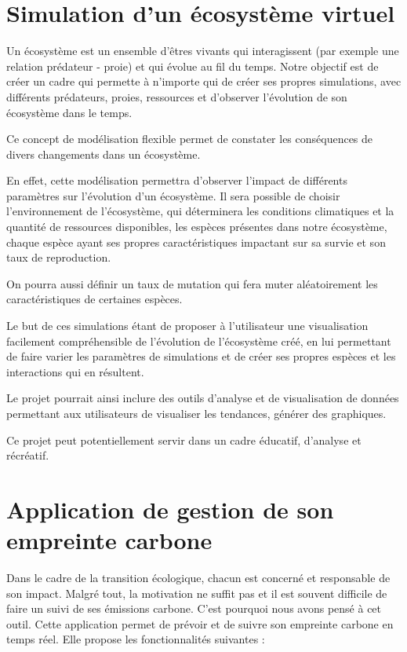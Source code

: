 \documentclass{article}
\begin{document}
\newpage

\section{Simulation d'un écosystème virtuel}

Un écosystème est un ensemble d'êtres vivants qui interagissent (par exemple une relation prédateur - proie) et qui évolue au fil du temps. Notre objectif est de créer un cadre qui permette à n'importe qui de créer ses propres simulations, avec différents prédateurs, proies, ressources et d'observer l'évolution de son écosystème dans le temps. \bigskip

Ce concept de modélisation flexible permet de constater les conséquences de divers changements dans un écosystème. \bigskip

En effet, cette modélisation permettra d'observer l'impact de différents paramètres sur l'évolution d'un écosystème. Il sera possible de choisir l'environnement de l'écosystème, qui déterminera les conditions climatiques et la quantité de ressources disponibles, les espèces présentes dans notre écosystème, chaque espèce ayant ses propres caractéristiques impactant sur sa survie et son taux de reproduction. \bigskip

On pourra aussi définir un taux de mutation qui fera muter aléatoirement les caractéristiques de certaines espèces. \bigskip

Le but de ces simulations étant de proposer à l'utilisateur une visualisation facilement compréhensible de l'évolution de l'écosystème créé, en lui permettant de faire varier les paramètres de simulations et de créer ses propres espèces et les interactions qui en résultent. \bigskip

Le projet pourrait ainsi inclure des outils d'analyse et de visualisation de données permettant aux utilisateurs de visualiser les tendances, générer des graphiques. \bigskip

Ce projet peut potentiellement servir dans un cadre éducatif, d'analyse et récréatif.

\newpage

\section{Application de gestion de son empreinte carbone}

Dans le cadre de la transition écologique, chacun est concerné et responsable de son impact. Malgré tout, la motivation ne suffit pas et il est souvent difficile de faire un suivi de ses émissions carbone. C'est pourquoi nous avons pensé à cet outil. Cette application permet de prévoir et de suivre son empreinte carbone en temps réel. Elle propose les fonctionnalités suivantes :
\end{document}
